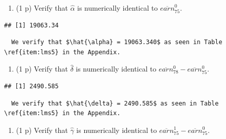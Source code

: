 \documentclass[
]{article}
\newenvironment{Shaded}{\begin{snugshade}}{\end{snugshade}}
\newcommand{\FunctionTok}[1]{\textcolor[rgb]{0.13,0.29,0.53}{\textbf{#1}}}
\newcommand{\NormalTok}[1]{#1}
\newcommand{\SpecialCharTok}[1]{\textcolor[rgb]{0.81,0.36,0.00}{\textbf{#1}}}
\providecommand{\tightlist}{%
  \setlength{\itemsep}{0pt}\setlength{\parskip}{0pt}}
\begin{document}
\begin{enumerate}
\def\labelenumi{\alph{enumi}.}
\setcounter{enumi}{1}
\tightlist
\item
  (1 p) Verify that \(\hat{\alpha}\) is numerically identical to
  \(\overline{earn}_{75}^{0}\).
\end{enumerate}

\begin{Shaded}
\end{Shaded}

\begin{verbatim}
## [1] 19063.34
\end{verbatim}

\begin{verbatim}
  We verify that $\hat{\alpha} = 19063.340$ as seen in Table \ref{item:lms5} in the Appendix. 
\end{verbatim}

\begin{enumerate}
\def\labelenumi{\alph{enumi}.}
\setcounter{enumi}{2}
\tightlist
\item
  (1 p) Verify that \(\hat{\delta}\) is numerically identical to
  \(\overline{earn}_{78}^{0}-\overline{earn}_{75}^{0}\).
\end{enumerate}

\begin{Shaded}
\end{Shaded}

\begin{verbatim}
## [1] 2490.585
\end{verbatim}

\begin{verbatim}
  We verify that $\hat{\delta} = 2490.585$ as seen in Table \ref{item:lms5} in the Appendix.
\end{verbatim}

\begin{enumerate}
\def\labelenumi{\alph{enumi}.}
\setcounter{enumi}{3}
\tightlist
\item
  (1 p) Verify that \(\hat{\gamma}\) is numerically identical to
  \(\overline{earn}_{75}^{1}-\overline{earn}_{75}^{0}\).
\end{enumerate}
\end{document}
